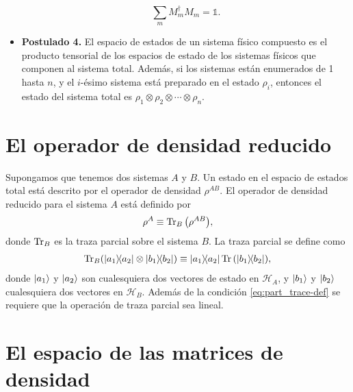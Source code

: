 \begin{itemize}
	\begin{equation}
	\sum _m M_m^{\dagger}M_m=\mathbb{1}.
	\label{eq:postulate2_completeness}
	\end{equation}
	\item[] \textbf{Postulado 4.} El espacio de estados de un sistema físico compuesto es el producto tensorial 
	de los espacios de estado de los sistemas físicos que componen al sistema total.
	Además, si los sistemas están enumerados de 1 hasta $n$, y el $i$-ésimo sistema
	está preparado en el estado $\rho_i$, entonces el estado del sistema total es
	$\rho_1\otimes\rho_2\otimes\cdots\otimes\rho_n$. 
\end{itemize}
\section{El operador de densidad reducido} %
Supongamos que tenemos dos sistemas $A$ y $B$. Un estado en el espacio de 
estados total está descrito por el operador de densidad $\rho^{AB}$. El
operador de densidad reducido para el sistema $A$ está definido por
\begin{align}
	\rho^A \equiv \Tr _B\qty(\rho^{AB}),
\end{align}
donde $\Tr_B$ es la traza parcial sobre el sistema $B$. La traza parcial
se define como 
\begin{align}
	\Tr_B (\dyad{a_1}{a_2}\otimes \dyad{b_1}{b_2})
	\equiv
	\dyad{a_1}{a_2}\Tr \qty(\dyad{b_1}{b_2}),
	\label{eq:part_trace-def}
\end{align}
donde $\ket{a_1}$ y $\ket{a_2}$ son cualesquiera dos vectores de estado en
$\mathcal{H}_A$, y $\ket{b_1}$ y $\ket{b_2}$ cualesquiera dos vectores
en $\mathcal{H}_B$. Además de la condición \eqref{eq:part_trace-def} se
requiere que la operación de traza parcial sea lineal.
\section{El espacio de las matrices de densidad}  %
